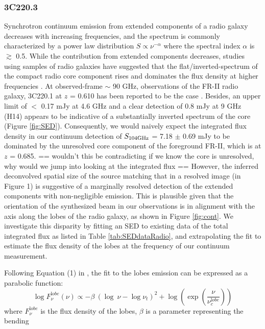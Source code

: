 \documentclass[twocolumn,apj,numberedappendix]{emulateapj}
\begin{document}
\subsubsection{3C220.3}
Synchrotron continuum emission from extended components of a radio galaxy decreases with increasing frequencies, 
and the spectrum is commonly characterized by a power law distribution $S \propto \nu^{-\alpha}$ where the 
spectral index $\alpha$ is $\gtrsim$ 0.5. While the contribution from extended components decreases, studies using 
samples of radio galaxies have suggested that the flat/inverted-spectrum of the compact radio core component rises 
and dominates the flux density at higher frequencies \citep{Kellermann81a,Begelman84a}. At observed-frame $\sim$ 90 GHz, 
observations of the FR-II radio galaxy, 3C220.1 at $z$ = 0.610 has been reported to be the case 
\citep{Hardcastle08a}. Besides, an upper 
limit of $<$ 0.17 mJy at 4.6 GHz \citep{Mullin06a} and a clear detection of 0.8 mJy at 9 GHz (H14) appears to 
be indicative of a substantially inverted spectrum of the core (Figure \ref{fig:SED}).
Consequently, we would naively expect the integrated flux density in our continuum detection of $S_{\rm 104GHz}$ = 7.18 $\pm$ 0.69 mJy to be dominated by the unresolved core component of the foreground FR-II, which is at $z$ = 0.685. == wouldn't this be contradicting if we know the core is unresolved, why would we jump into looking at the integrated flux ==
However, the inferred deconvolved spatial size of the source matching that in a resolved image (in Figure 1) is 
suggestive of a marginally resolved detection of the extended components with non-negligible emission. 
This is plausible given that the orientation of the synthesized beam in our observations is in alignment with the 
axis along the 
lobes of the radio galaxy, as shown in Figure \ref{fig:cont}. We investigate this disparity by fitting an SED to 
existing data of the total integrated flux as listed in Table \ref{tab:SEDdataRadio}, and extrapolating the fit to 
estimate the flux density of the lobes at the frequency of our continuum measurement. 

Following Equation (1) in \citet{Cleary07a}, the fit to the lobes emission can be expressed as a parabolic function:
\begin{equation}
\log F_{\nu}^{\mathrm lobe} (\nu) \propto - \beta\ (\log\ \nu - \log \nu_{t})^2  + \log (\exp({\frac{\nu}{\nu_c^{\mathrm lobe}}}))
\end{equation}
where $F_{\nu}^{\mathrm lobe}$ is the flux density of the lobes, $\beta$ is a parameter representing the bending 
\end{document}
